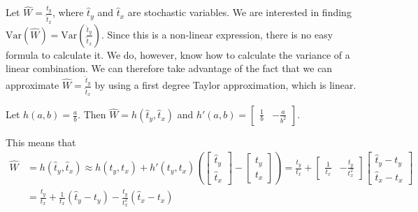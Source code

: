 \documentclass{article}
\begin{document}
\begin{example}
  Let \(\widehat{W} = \frac{\hat{t}_y}{\hat{t}_x}\), where \(\hat{t}_y\) and \(\hat{t}_x\) are stochastic variables. We
  are interested in finding \(\mathrm{Var} \left( \widehat{W} \right) = \mathrm{Var}
  \left( \frac{\hat{t}_y}{\hat{t}_x} \right)\).
  Since this is a non-linear expression, there is no easy formula to calculate
  it. We do, however, know how to calculate the variance of a linear
  combination. We can therefore take advantage of the fact that we can
  approximate \(\widehat{W} = \frac{\hat{t}_y}{\hat{t}_x}\) by using a first degree Taylor approximation,
  which is linear.

  Let \(h(a, b) = \frac{a}{b}\). Then \(\widehat{W} = h(\hat{t}_y, \hat{t}_x)\) and
  \(h'(a, b) = \begin{bmatrix} \frac{1}{b} & -\frac{a}{b^2} \end{bmatrix}.\)

  This means that
  \begin{align*}
    \widehat{W} &= h(\hat{t}_y, \hat{t}_x)
    \approx h(t_y, t_x) + h'(t_y, t_x) \left( \begin{bmatrix} \hat{t}_y \\ \hat{t}_x \end{bmatrix}
    - \begin{bmatrix} t_y \\ t_x \end{bmatrix} \right)
    = \frac{t_y}{t_x} + \begin{bmatrix} \frac{1}{t_x} &
    -\frac{t_y}{t_x^2} \end{bmatrix} \begin{bmatrix} \hat{t}_y - t_y \\
      \hat{t}_x - t_x \end{bmatrix} \\
    &= \frac{t_y}{t_x} + \frac{1}{t_x} \left( \hat{t}_y - t_y \right) - \frac{t_y}{t_x^2} \left( \hat{t}_x - t_x \right)
    \end{align*}


\end{example}
\end{document}
